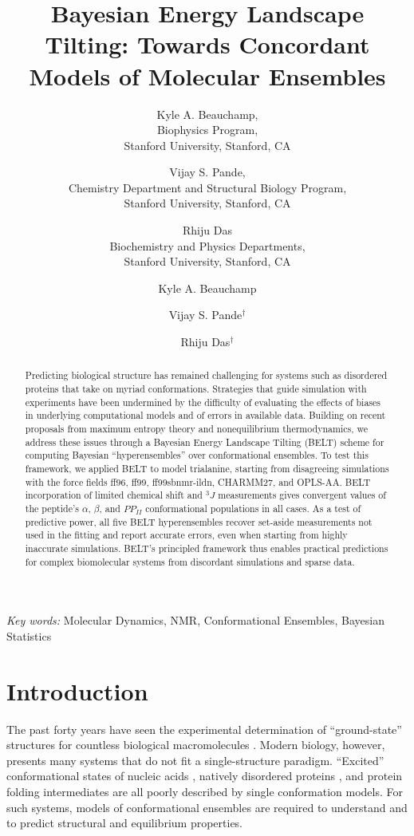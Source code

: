 \documentclass[journal=jacsat,manuscript=article]{achemso}
\author{Kyle A. Beauchamp, \\
Biophysics Program, \\
Stanford University, Stanford, CA
\and Vijay S. Pande, \\
Chemistry Department and Structural Biology Program, \\
Stanford University, Stanford, CA
\and Rhiju Das \\
Biochemistry and Physics Departments, \\
Stanford University, Stanford, CA
}
\author{Kyle A. Beauchamp}
\affiliation[Biophysics Program]{Biophysics Program}
\author{Vijay S. Pande$^\dagger$}
\affiliation[Chemistry Department]{Chemistry Department, Stanford University, Stanford, CA}
\author{Rhiju Das$^\dagger$}
\affiliation[Biochemistry Department]{Biochemistry Department, Stanford University, Stanford, CA}
\title{Bayesian Energy Landscape Tilting: Towards Concordant Models of Molecular Ensembles}
\begin{document}
\maketitle

\begin{abstract}

Predicting biological structure has remained challenging for systems such as disordered proteins that take on myriad conformations. Strategies that guide simulation with experiments have been undermined by the difficulty of evaluating the effects of biases in underlying computational models and of errors in available data. Building on recent proposals from maximum entropy theory and nonequilibrium thermodynamics, we address these issues through a Bayesian Energy Landscape Tilting (BELT) scheme for computing Bayesian \enquote{hyperensembles} over conformational ensembles.  To test this framework, we applied BELT to model trialanine, starting from disagreeing simulations with the force fields ff96, ff99, ff99sbnmr-ildn, CHARMM27, and OPLS-AA. BELT incorporation of limited chemical shift and $^3J$ measurements gives convergent values of the peptide's $\alpha$, $\beta$, and $PP_{II}$ conformational populations in all cases. As a test of predictive power, all five BELT hyperensembles recover set-aside 
measurements not used in the fitting and report accurate errors, even when starting from highly inaccurate simulations. BELT's principled framework thus enables practical predictions for complex biomolecular systems from discordant simulations and sparse data.   

\end{abstract}

\emph{Key words:} Molecular Dynamics, NMR, Conformational Ensembles,  Bayesian Statistics

\section*{Introduction}

The past forty years have seen the experimental determination of ``ground-state'' structures for countless biological macromolecules \cite{Berman2000}. Modern biology, however, presents many systems that do not fit a single-structure paradigm.  ``Excited'' conformational states of nucleic acids \cite{dethoff2012}, natively disordered proteins \cite{fink2005}, and protein folding intermediates \cite{korzhnev2004} are all poorly described by single conformation models.  For such systems, models of conformational ensembles are required to understand and to predict structural and equilibrium properties.  
\end{document}
